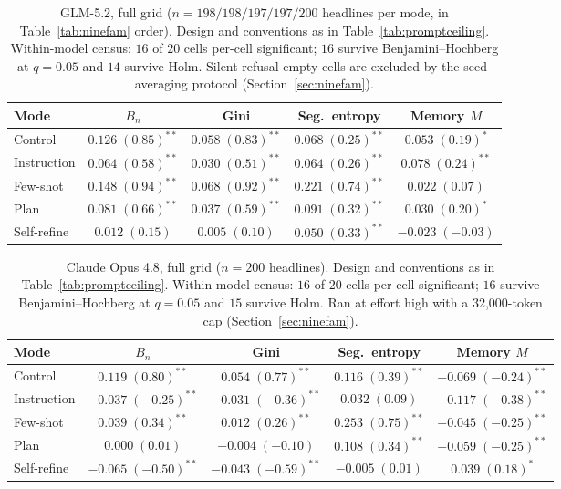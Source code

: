 \begin{table}[htbp]
\centering
\small
\caption{GLM-5.2, full grid ($n=198/198/197/197/200$ headlines per mode, in Table~\ref{tab:ninefam} order). Design and conventions as in Table~\ref{tab:promptceiling}. Within-model census: $16$ of $20$ cells per-cell significant; $16$ survive Benjamini--Hochberg at $q=0.05$ and $14$ survive Holm. Silent-refusal empty cells are excluded by the seed-averaging protocol (Section~\ref{sec:ninefam}).}
\label{tab:grid-glm}
\begin{tabular}{lcccc}
\toprule
Mode & $B_n$ & Gini & Seg.\ entropy & Memory $M$ \\
\midrule
Control & $0.126\;(0.85)^{**}$ & $0.058\;(0.83)^{**}$ & $0.068\;(0.25)^{**}$ & $0.053\;(0.19)^{*}$ \\
Instruction & $0.064\;(0.58)^{**}$ & $0.030\;(0.51)^{**}$ & $0.064\;(0.26)^{**}$ & $0.078\;(0.24)^{**}$ \\
Few-shot & $0.148\;(0.94)^{**}$ & $0.068\;(0.92)^{**}$ & $0.221\;(0.74)^{**}$ & $0.022\;(0.07)$ \\
Plan & $0.081\;(0.66)^{**}$ & $0.037\;(0.59)^{**}$ & $0.091\;(0.32)^{**}$ & $0.030\;(0.20)^{*}$ \\
Self-refine & $0.012\;(0.15)$ & $0.005\;(0.10)$ & $0.050\;(0.33)^{**}$ & $-0.023\;(-0.03)$ \\
\bottomrule
\end{tabular}
\end{table}

\begin{table}[htbp]
\centering
\small
\caption{Claude Opus 4.8, full grid ($n=200$ headlines). Design and conventions as in Table~\ref{tab:promptceiling}. Within-model census: $16$ of $20$ cells per-cell significant; $16$ survive Benjamini--Hochberg at $q=0.05$ and $15$ survive Holm. Ran at effort high with a 32{,}000-token cap (Section~\ref{sec:ninefam}).}
\label{tab:grid-opus}
\begin{tabular}{lcccc}
\toprule
Mode & $B_n$ & Gini & Seg.\ entropy & Memory $M$ \\
\midrule
Control & $0.119\;(0.80)^{**}$ & $0.054\;(0.77)^{**}$ & $0.116\;(0.39)^{**}$ & $-0.069\;(-0.24)^{**}$ \\
Instruction & $-0.037\;(-0.25)^{**}$ & $-0.031\;(-0.36)^{**}$ & $0.032\;(0.09)$ & $-0.117\;(-0.38)^{**}$ \\
Few-shot & $0.039\;(0.34)^{**}$ & $0.012\;(0.26)^{**}$ & $0.253\;(0.75)^{**}$ & $-0.045\;(-0.25)^{**}$ \\
Plan & $0.000\;(0.01)$ & $-0.004\;(-0.10)$ & $0.108\;(0.34)^{**}$ & $-0.059\;(-0.25)^{**}$ \\
Self-refine & $-0.065\;(-0.50)^{**}$ & $-0.043\;(-0.59)^{**}$ & $-0.005\;(0.01)$ & $0.039\;(0.18)^{*}$ \\
\bottomrule
\end{tabular}
\end{table}

